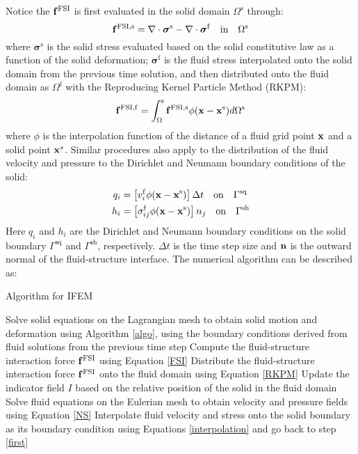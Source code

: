 Notice the $\bold{f}^\mathrm{FSI}$ is first evaluated in the solid domain $\Omega^\mathrm{s}$ through:
\begin{equation} \label{FSI}
\bold{f}^\mathrm{FSI,s} = \nabla \cdot \boldsymbol{\sigma}^\mathrm{s} - \nabla \cdot \boldsymbol{\sigma}^\mathrm{f} \quad \mathrm{in} \quad \Omega^\mathrm{s}
\end{equation}
where $\boldsymbol\sigma^\mathrm{s}$ is the solid stress evaluated based on the solid constitutive law as a function of the solid deformation; $\boldsymbol\sigma^\mathrm{f}$ is the fluid stress interpolated onto the solid domain from the previous time solution, and then distributed onto the fluid domain as $\Omega^\mathrm{f}$ with the Reproducing Kernel Particle Method (RKPM):
\begin{equation} \label{RKPM}
\bold{f}^\mathrm{FSI,f} = \int_\Omega^\mathrm{s} \bold{f}^\mathrm{FSI,s}\phi(\bold{x} - \bold{x}^\mathrm{s})d\Omega^\mathrm{s}
\end{equation}
where $\phi$ is the interpolation function of the distance of a fluid grid point $\bold{x}$ and a solid point $\bold{x}^s$. Similar procedures also apply to the distribution of the fluid velocity and pressure to the Dirichlet and Neumann boundary conditions of the solid:
\begin{subequations} \label{interpolation}
\begin{align}
q_i &= \left[ v_i^\mathrm{f} \phi(\bold{x} - \bold{x}^\mathrm{s}) \right]\Delta t \quad \mathrm{on} \quad \Gamma^\mathrm{sq} \\
h_i &= \left[ \sigma_{ij}^\mathrm{f} \phi(\bold{x} - \bold{x}^\mathrm{s}) \right]n_j \quad \mathrm{on} \quad \Gamma^\mathrm{sh}
\end{align}
\end{subequations}
Here $q_i$ and $h_i$ are the Dirichlet and Neumann boundary conditions on the solid boundary $\Gamma^\mathrm{sq}$ and $\Gamma^\mathrm{sh}$, respectively. $\Delta t$ is the time step size and $\bold{n}$ is the outward normal of the fluid-structure interface. The numerical algorithm can be described as:
\begin{algorithm}
	\caption{Algorithm for IFEM}  \label{IFEMalgo}
	\begin{algorithmic}[1]
	\State Solve solid equations on the Lagrangian mesh to obtain solid motion and deformation using Algorithm \ref{algo}, using the boundary conditions derived from fluid solutions from the previous time step \label{first}
	\State Compute the fluid-structure interaction force $\bold{f}^\mathrm{FSI}$ using Equation \ref{FSI}
	\State Distribute the fluid-structure interaction force $\bold{f}^\mathrm{FSI}$ onto the fluid domain using Equation \ref{RKPM}
	\State Update the indicator field $I$ based on the relative position of the solid in the fluid domain
	\State Solve fluid equations on the Eulerian mesh to obtain velocity and pressure fields using Equation \ref{NS}
	\State Interpolate fluid velocity and stress onto the solid boundary as its boundary condition using Equations \ref{interpolation} and go back to step \ref{first}
	\end{algorithmic}
\end{algorithm}

